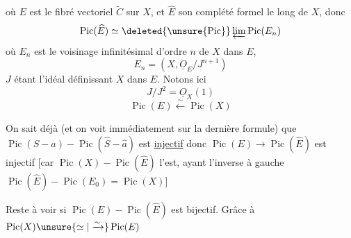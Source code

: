 où $E$ est le fibré vectoriel $\widetilde C$ sur $X$, et $\widehat E$ son complété formel le long de $X$, donc
\[
\operatorname{Pic}(\widehat E)\simeq\deleted{\unsure{\operatorname{Pic}}}\varprojlim\operatorname{Pic}(E_n)
\]
où $E_n$ est le voisinage infinitésimal d'ordre $n$ de $X$ dans $E$,
\[
E_n=(X,\underline O_E/J^{n+1})
\]
$J$ étant l'idéal définissant $X$ dans $E$. Notons ici
\[
J/J^2=\underline O_X(1)
\]
\[
\operatorname{Pic}(E)\xleftarrow{\sim}\operatorname{Pic}(X)
\]

On sait déjà   (et on voit immédiatement sur la dernière formule) que $\operatorname{Pic}(S-a)\mathbin{-}\operatorname{Pic}(\widehat S-\hat a)$ est \uline{injectif} donc $\operatorname{Pic}(E)\longrightarrow\operatorname{Pic}(\widehat E)$ est injectif [car $\operatorname{Pic}(X)\mathbin{-}\operatorname{Pic}(\widehat E)$ l'est, ayant l'inverse à gauche $\operatorname{Pic}(\widehat E)\mathbin{-}\operatorname{Pic}(E_0)=\operatorname{Pic}(X)$]

Reste à voir si $\operatorname{Pic}(E)\mathbin{-}\operatorname{Pic}(\widehat E)$ est bijectif. Grâce à $\operatorname{Pic}(X)\unsure{\simeq|\xrightarrow{\sim}}\operatorname{Pic}(E)$
